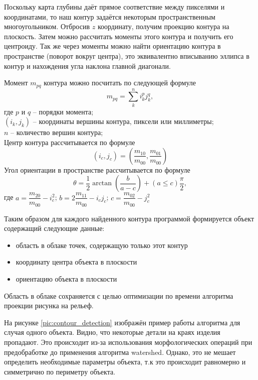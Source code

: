         Поскольку карта глубины даёт прямое соответствие между пикселями и координатами, то наш контур задаётся некоторым пространственным многоугольником. Отбросив $ z $ координату, получим проекцию контура на плоскость. Затем можно рассчитать моменты этого контура и получить его центроиду. Так же через моменты можно найти ориентацию контура в пространстве (поворот вокруг центра), это эквивалентно вписыванию эллипса в контур и нахождения угла наклона главной диагонали.
        
        Момент $ m_{pq} $ контура можно посчитать по следующей формуле
        \begin{equation}
            m_{pq} = \sum\limits_{k}^{n}i_k^p j_k^q,
        \end{equation}
        где $ p $ и $ q $ -- порядки момента;\\
        $ \left(i_k, j_k\right) $ -- координаты вершины контура, пиксели или миллиметры;\\
        $ n $ -- количество вершин контура;\\
        Центр контура рассчитывается по формуле
        \begin{equation}
            (i_c,j_c) = \left(\dfrac{m_{10}}{m_{00}}, \dfrac{m_{01}}{m_{00}}\right)
        \end{equation}
        Угол ориентации в пространстве рассчитывается по формуле
        \begin{equation}
            \theta = \dfrac{1}{2}\arctan\left(\dfrac{b}{a-c}\right) + \left(a\le c\right)\dfrac{\pi}{2},
        \end{equation}
        где $ a = \dfrac{m_{20}}{m_{00}} - i_c^2 $; 
        $ b = 2\dfrac{m_{11}}{m_{00}} - i_cj_c $; 
        $ c = \dfrac{m_{02}}{m_{00}} - j_c^2 $
        
        Таким образом для каждого найденного контура программой формируется объект содержащий следующие данные:
        \begin{itemize}
            \item область в облаке точек, содержащую только этот контур
            \item координату центра объекта в плоскости
            \item ориентацию объекта в плоскости
        \end{itemize}
        Область в облаке сохраняется с целью оптимизации по времени алгоритма проекции рисунка на рельеф.
        
        На рисунке \ref{pic:contour_detection} изображён пример работы алгоритма для случая одного объекта. Видно, что некоторые детали на краях изделия пропадают. Это происходит из-за использования морфологических операций при предобработке до применения алгоритма watershed. Однако, это не мешает определить необходимые параметры объекта, т.к это происходит равномерно и симметрично по периметру объекта.
        
